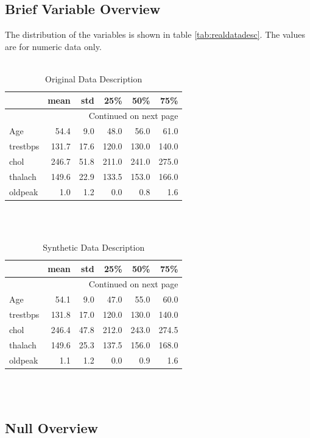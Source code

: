 \documentclass{article}
\begin{document}
\subsection{Brief Variable Overview}
The distribution of the variables is shown in table \ref{tab:realdatadesc}. The values are for numeric data only.\\
\\
\begin{longtable}{lrrrrr}
\caption{Original Data Description}\label{Realdatadesc}\\
\toprule
{} &  mean &  std &   25\% &   50\% &   75\% \\
\midrule
\endhead
\midrule
\multicolumn{6}{r}{{Continued on next page}} \\
\midrule
\endfoot

\bottomrule
\endlastfoot
Age      &  54.4 &  9.0 &  48.0 &  56.0 &  61.0 \\
trestbps & 131.7 & 17.6 & 120.0 & 130.0 & 140.0 \\
chol     & 246.7 & 51.8 & 211.0 & 241.0 & 275.0 \\
thalach  & 149.6 & 22.9 & 133.5 & 153.0 & 166.0 \\
oldpeak  &   1.0 &  1.2 &   0.0 &   0.8 &   1.6 \\
\end{longtable}

\\
\\
\begin{longtable}{lrrrrr}
\caption{Synthetic Data Description}\label{Synth data desc}\\
\toprule
{} &  mean &  std &   25\% &   50\% &   75\% \\
\midrule
\endhead
\midrule
\multicolumn{6}{r}{{Continued on next page}} \\
\midrule
\endfoot

\bottomrule
\endlastfoot
Age      &  54.1 &  9.0 &  47.0 &  55.0 &  60.0 \\
trestbps & 131.8 & 17.0 & 120.0 & 130.0 & 140.0 \\
chol     & 246.4 & 47.8 & 212.0 & 243.0 & 274.5 \\
thalach  & 149.6 & 25.3 & 137.5 & 156.0 & 168.0 \\
oldpeak  &   1.1 &  1.2 &   0.0 &   0.9 &   1.6 \\
\end{longtable}

\\
\\
\subsection{Null Overview}
\end{document}
